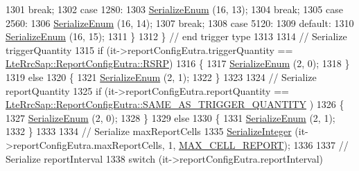 \begin{DoxyCode}
1301                   \textcolor{keywordflow}{break};
1302                 \textcolor{keywordflow}{case} 1280:
1303                   \hyperlink{classns3_1_1Asn1Header_ac8e56956823ab8e4470c09e162e7bf24}{SerializeEnum} (16, 13);
1304                   \textcolor{keywordflow}{break};
1305                 \textcolor{keywordflow}{case} 2560:
1306                   \hyperlink{classns3_1_1Asn1Header_ac8e56956823ab8e4470c09e162e7bf24}{SerializeEnum} (16, 14);
1307                   \textcolor{keywordflow}{break};
1308                 \textcolor{keywordflow}{case} 5120:
1309                 \textcolor{keywordflow}{default}:
1310                   \hyperlink{classns3_1_1Asn1Header_ac8e56956823ab8e4470c09e162e7bf24}{SerializeEnum} (16, 15);
1311                 \}
1312             \} \textcolor{comment}{// end trigger type}
1313 
1314           \textcolor{comment}{// Serialize triggerQuantity}
1315           \textcolor{keywordflow}{if} (it->reportConfigEutra.triggerQuantity == 
      \hyperlink{structns3_1_1LteRrcSap_1_1ReportConfigEutra_a82343ddf526faba0483431ea5882a3efa5b7591e86ab7bcefc7fe1528762114d7}{LteRrcSap::ReportConfigEutra::RSRP})
1316             \{
1317               \hyperlink{classns3_1_1Asn1Header_ac8e56956823ab8e4470c09e162e7bf24}{SerializeEnum} (2, 0);
1318             \}
1319           \textcolor{keywordflow}{else}
1320             \{
1321               \hyperlink{classns3_1_1Asn1Header_ac8e56956823ab8e4470c09e162e7bf24}{SerializeEnum} (2, 1);
1322             \}
1323 
1324           \textcolor{comment}{// Serialize reportQuantity}
1325           \textcolor{keywordflow}{if} (it->reportConfigEutra.reportQuantity == 
      \hyperlink{structns3_1_1LteRrcSap_1_1ReportConfigEutra_a6d641a71ebc481d2eb99359e72e9ea40a8d1efc27a4f5f4d31da331b3be437072}{LteRrcSap::ReportConfigEutra::SAME\_AS\_TRIGGER\_QUANTITY}
      )
1326             \{
1327               \hyperlink{classns3_1_1Asn1Header_ac8e56956823ab8e4470c09e162e7bf24}{SerializeEnum} (2, 0);
1328             \}
1329           \textcolor{keywordflow}{else}
1330             \{
1331               \hyperlink{classns3_1_1Asn1Header_ac8e56956823ab8e4470c09e162e7bf24}{SerializeEnum} (2, 1);
1332             \}
1333 
1334           \textcolor{comment}{// Serialize maxReportCells}
1335           \hyperlink{classns3_1_1Asn1Header_ab1c3bd37730affa7473bc759d625c29a}{SerializeInteger} (it->reportConfigEutra.maxReportCells, 1, 
      \hyperlink{lte-rrc-header_8cc_a0a29c59f448f689482054e43277599ab}{MAX\_CELL\_REPORT});
1336 
1337           \textcolor{comment}{// Serialize reportInterval}
1338           \textcolor{keywordflow}{switch} (it->reportConfigEutra.reportInterval)

\end{DoxyCode}
